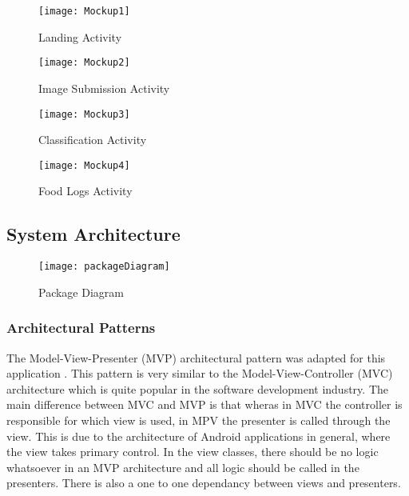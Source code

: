 \begin{figure}[h] 
  \label{ fig7} 
  \begin{minipage}[b]{0.5\linewidth}
    \centering
    \texttt{[image: Mockup1]} 
    \caption{Landing Activity} 
  \label{fig:page1}
    \vspace{4ex}
  \end{minipage}%
  \begin{minipage}[b]{0.5\linewidth}
    \centering
    \texttt{[image: Mockup2]} 
    \caption{Image Submission Activity} 
  \label{fig:page2}
    \vspace{4ex}
  \end{minipage} 
  \begin{minipage}[b]{0.5\linewidth}
    \centering
    \texttt{[image: Mockup3]} 
    \caption{Classification Activity} 
    \label{fig:page3}
    \vspace{4ex}
  \end{minipage}%
  \begin{minipage}[b]{0.5\linewidth}
    \centering
    \texttt{[image: Mockup4]} 
    \caption{Food Logs Activity} 
    \label{fig:page4}
    \vspace{4ex}
  \end{minipage} 
\end{figure}
\afterpage{\clearpage}

\subsection*{System Architecture}

\begin{figure}[h]
    \centering
    \texttt{[image: packageDiagram]}
    \caption{Package Diagram}
    \label{fig:packageDiagram}
\end{figure}

\subsubsection*{Architectural Patterns}
The Model-View-Presenter (MVP) architectural pattern was adapted for this application \textcite{mvp}.
This pattern is very similar to the Model-View-Controller (MVC) architecture which is quite popular in the software development industry.
The main difference between MVC and MVP is that wheras in MVC the controller is responsible for which view is used, in MPV the presenter is called through the view.
This is due to the architecture of Android applications in general, where the view takes primary control.
In the view classes, there should be no logic whatsoever in an MVP architecture and all logic should be called in the presenters.
There is also a one to one dependancy between views and presenters.


